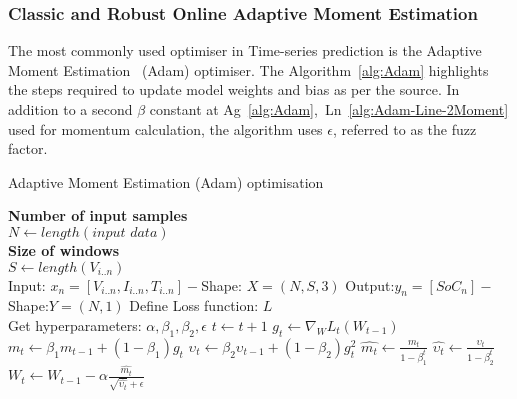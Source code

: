 %
\subsubsection{Classic and Robust Online Adaptive Moment Estimation}
The most commonly used optimiser in Time-series prediction is the Adaptive Moment Estimation~\cite{kingma_adam_2017} (Adam) optimiser.
The \mbox{Algorithm~\ref{alg:Adam}} highlights the steps required to update model weights and bias as per the source.
In addition to a second $\beta$ constant at \mbox{Ag~\ref{alg:Adam}, Ln~\ref{alg:Adam-Line-2Moment}} used for momentum calculation, the algorithm uses $\epsilon$, referred to as the fuzz factor.
\begin{algorithm}
  \caption{Adaptive Moment Estimation (Adam) optimisation}
  \begin{algorithmic}[1]
    \STATE \textbf{Number of input samples} \\ $N\gets length(\textit{input data})$\\
    \STATE \textbf{Size of windows} \\ $S\gets length(V_{i..n})$\\
    \STATE Input: $x_n = [V_{i..n}, I_{i..n}, T_{i..n}] - $Shape: $X = (N, S, 3)$
    \STATE Output:$y_n = [SoC_{n}] - $Shape:$Y = (N, 1)$
    \STATE Define Loss function: $L$ \\
           Get hyperparameters: $\alpha, \beta_1, \beta_2, \epsilon$
    \STATE $t \gets t+1$
    \STATE $g_t \gets \nabla_W L_t (W_{t-1})$ 
    \STATE $m_t \gets \beta_1 m_{t-1}+(1-\beta_1) g_t $ 
    \STATE $\upsilon_t \gets \beta_2 \upsilon_{t-1}+ \left(1-\beta_2 \right)g^2_t $ 
    \STATE $\hat{m_t} \gets \frac{m_t}{1-\beta^t_1}$ 
    \STATE $\hat{\upsilon_t} \gets \frac{\upsilon_t}{1-\beta^t_2} $ 
    \STATE $W_t \gets W_{t-1}- \alpha \frac{\hat{m_t}}{\sqrt{\hat{\upsilon_t}}+\epsilon} $ 
    \ENDWHILE
  \end{algorithmic}
  \label{alg:Adam}
\end{algorithm}

